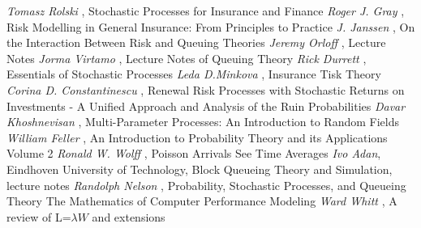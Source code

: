 \documentclass[a4paper, 12pt]{article} %
\begin{document}

\begin{thebibliography}{9}
\emph{Tomasz Rolski }, Stochastic Processes for Insurance and Finance
\emph{Roger J. Gray }, Risk Modelling in General Insurance: From Principles to Practice
\emph{J. Janssen }, On the Interaction Between Risk and Queuing Theories
\emph{Jeremy Orloff }, Lecture Notes
\emph{Jorma Virtamo }, Lecture Notes of Queuing Theory
\emph{Rick Durrett }, Essentials of Stochastic Processes
\emph{Leda D.Minkova }, Insurance Tisk Theory
\emph{Corina D. Constantinescu }, Renewal Risk Processes with Stochastic Returns on Investments - A Unified
Approach and Analysis of the Ruin Probabilities 
\emph{Davar Khoshnevisan }, Multi-Parameter Processes:
An Introduction to Random Fields
\emph{William Feller }, An Introduction to Probability Theory and its Applications Volume 2
\emph{Ronald W. Wolff }, Poisson Arrivals See Time Averages 
\emph{Ivo Adan}, Eindhoven University of Technology, Block Queueing Theory and Simulation, lecture notes
\emph{Randolph Nelson }, Probability, Stochastic Processes, and Queueing Theory
The Mathematics of Computer Performance Modeling
\emph{Ward Whitt }, A review of L=$\lambda W$ and extensions 
\end{thebibliography}
\end{document}
